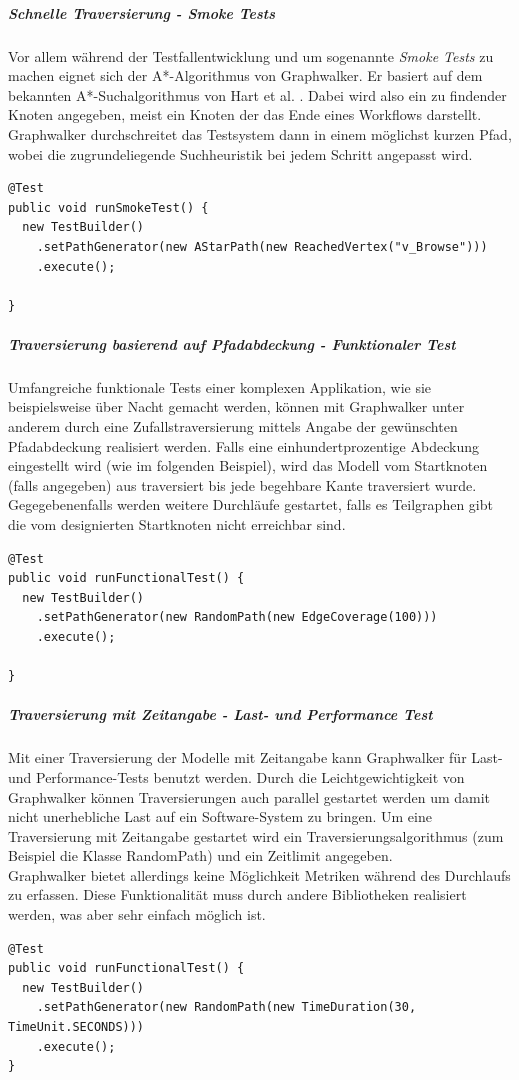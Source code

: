 \subparagraph{Schnelle Traversierung - Smoke Tests}
Vor allem während der Testfallentwicklung und um sogenannte \textit{Smoke Tests} zu machen eignet sich der A*-Algorithmus von Graphwalker. Er basiert auf dem bekannten A*-Suchalgorithmus von Hart et al. \cite{hart_formal_1968}. Dabei wird also ein zu findender Knoten angegeben, meist ein Knoten der das Ende eines Workflows darstellt. Graphwalker durchschreitet das Testsystem dann in einem möglichst kurzen Pfad, wobei die zugrundeliegende Suchheuristik bei jedem Schritt angepasst wird.
\begin{verbatim}
@Test
public void runSmokeTest() {
  new TestBuilder()
    .setPathGenerator(new AStarPath(new ReachedVertex("v_Browse")))
    .execute();
    
}
\end{verbatim}


\subparagraph{Traversierung basierend auf Pfadabdeckung - Funktionaler Test}
Umfangreiche funktionale Tests einer komplexen Applikation, wie sie beispielsweise über Nacht gemacht werden, können mit Graphwalker unter anderem durch eine Zufallstraversierung mittels Angabe der gewünschten Pfadabdeckung realisiert werden. Falls eine einhundertprozentige Abdeckung eingestellt wird (wie im folgenden Beispiel), wird das Modell vom Startknoten (falls angegeben) aus traversiert bis jede begehbare Kante traversiert wurde. Gegegebenenfalls werden weitere Durchläufe gestartet, falls es Teilgraphen gibt die vom designierten Startknoten nicht erreichbar sind. 

\begin{verbatim}
@Test
public void runFunctionalTest() {
  new TestBuilder()
    .setPathGenerator(new RandomPath(new EdgeCoverage(100)))
    .execute();
    
}
\end{verbatim}

\subparagraph{Traversierung mit Zeitangabe - Last- und Performance Test}
Mit einer Traversierung der Modelle mit Zeitangabe kann Graphwalker für Last- und Performance-Tests benutzt werden. Durch die Leichtgewichtigkeit von Graphwalker können Traversierungen auch parallel gestartet werden um damit nicht unerhebliche Last auf ein Software-System zu bringen. Um eine Traversierung mit Zeitangabe gestartet wird ein Traversierungsalgorithmus (zum Beispiel die Klasse RandomPath) und ein Zeitlimit angegeben.\\
Graphwalker bietet allerdings keine Möglichkeit Metriken während des Durchlaufs zu erfassen. Diese Funktionalität muss durch andere Bibliotheken realisiert werden, was aber sehr einfach möglich ist.
\begin{verbatim}
@Test
public void runFunctionalTest() {  
  new TestBuilder()
    .setPathGenerator(new RandomPath(new TimeDuration(30, TimeUnit.SECONDS)))
    .execute();
}
\end{verbatim}

